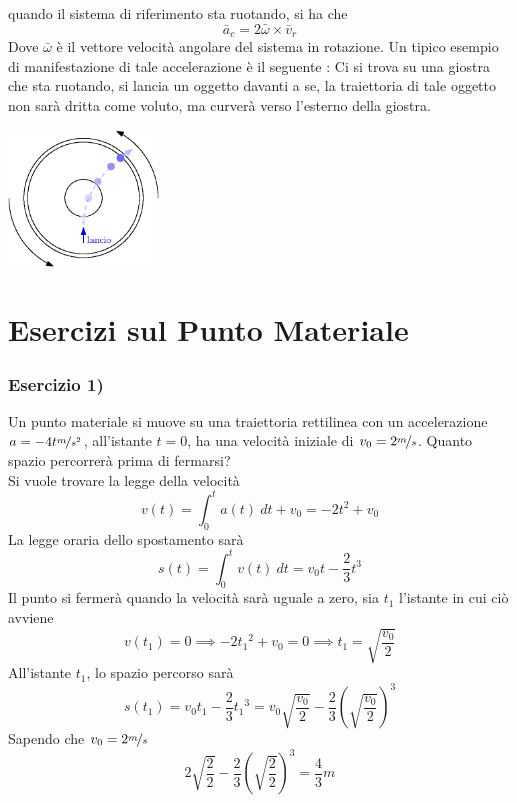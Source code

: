 \documentclass[10pt, letterpaper]{report}
\begin{document}
quando il sistema di riferimento sta ruotando, si ha che 
$$\bar a_c = 2\bar \omega \times \bar v_r $$
Dove $\bar \omega$ è il vettore velocità angolare del sistema in rotazione. Un tipico esempio di 
manifestazione di tale accelerazione è il seguente : Ci si trova su una giostra che sta ruotando, 
si lancia un oggetto davanti a se, la traiettoria di tale oggetto non sarà dritta come 
voluto, ma curverà verso l'esterno della giostra.\begin{center}
    \includegraphics[width=0.3\textwidth]{images/Coriolis.eps}
    \end{center}
\flowerLine
\section{Esercizi sul Punto Materiale}
\subsubsection{Esercizio 1)}
Un punto materiale si muove su una traiettoria rettilinea con un accelerazione 
$a=-4t\nicefrac{m}{s^2}$, all'istante $t=0$, ha una velocità iniziale di $v_0=2\nicefrac{m}{s}$. 
Quanto spazio percorrerà prima di fermarsi?\\ 
Si vuole trovare la legge della velocità 
$$v(t)=\int_0^t a(t)  \ dt + v_0=-2t^2+v_0$$
La legge oraria dello spostamento sarà 
$$ s(t)=\int_0^t v(t) \ dt = v_0t-\frac{2}{3}t^3$$
Il punto si fermerà quando la velocità sarà uguale a zero, sia $t_1$ l'istante in cui ciò avviene 
$$ v(t_1)=0\implies -2{t_1}^2+v_0=0\implies t_1=\sqrt{\frac{v_0}{2}}$$
All'istante $t_1$, lo spazio percorso sarà 
$$ s(t_1)=v_0t_1-\frac{2}{3}{t_1}^3=
v_0\sqrt{\frac{v_0}{2}}-\frac{2}{3}{(\sqrt{\frac{v_0}{2}})}^3$$Sapendo che $v_0=2\nicefrac{m}{s}$
$$
2\sqrt{\frac{2}{2}}-\frac{2}{3}{(\sqrt{\frac{2}{2}})}^3=\frac{4}{3} m
$$
\end{document}
